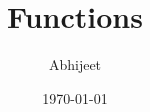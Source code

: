 \documentclass{beamer}
\title{Functions}
\author{Abhijeet}
\institute{IGIDR}
\date{\today}
\begin{document}
\begin{frame}[plain]
  \titlepage
\end{frame}
\end{document}
